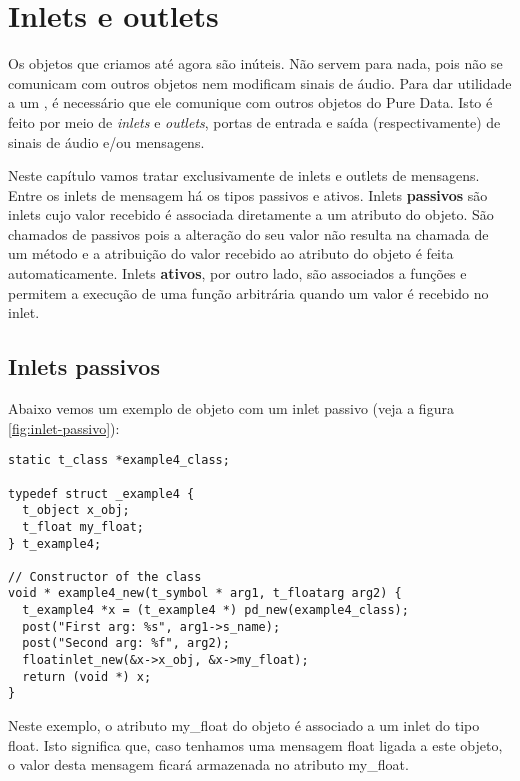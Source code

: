 
\chapter{Inlets e outlets}

Os objetos que criamos até agora são inúteis. Não servem para nada, pois não
se comunicam com outros objetos nem modificam sinais de áudio. Para dar
utilidade a um \external, é necessário que ele comunique com outros objetos
do Pure Data. Isto é feito por meio de \emph{inlets} e \emph{outlets}, portas
de entrada e saída (respectivamente) de sinais de áudio e/ou mensagens.

Neste capítulo vamos tratar exclusivamente de inlets e outlets de mensagens.
Entre os inlets de mensagem há os tipos passivos e ativos. Inlets \textbf{passivos} são
inlets cujo valor recebido é associada diretamente a um atributo do objeto.
São chamados de passivos pois a alteração do seu valor não resulta na chamada
de um método e a atribuição do valor recebido ao atributo do objeto é feita
automaticamente.  Inlets \textbf{ativos}, por outro lado, são associados a
funções e permitem a execução de uma função arbitrária quando um valor é
recebido no inlet.

\section{Inlets passivos}

Abaixo vemos um exemplo de objeto com um inlet passivo (veja a figura
\ref{fig:inlet-passivo}):

\begin{lstlisting}
static t_class *example4_class;

typedef struct _example4 {
  t_object x_obj;
  t_float my_float;
} t_example4;

// Constructor of the class
void * example4_new(t_symbol * arg1, t_floatarg arg2) {
  t_example4 *x = (t_example4 *) pd_new(example4_class);
  post("First arg: %s", arg1->s_name);
  post("Second arg: %f", arg2);
  floatinlet_new(&x->x_obj, &x->my_float);
  return (void *) x;
}
\end{lstlisting}

Neste exemplo, o atributo my\_float do objeto é associado a um inlet do tipo float. Isto 
significa que, caso tenhamos uma mensagem float ligada a este objeto, o valor
desta mensagem ficará armazenada no atributo my\_float.

